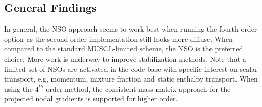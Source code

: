 \subsection{General Findings}
In general, the NSO approach seems to work best when running the fourth-order option as the second-order 
implementation still looks more diffuse. When compared to the standard MUSCL-limited scheme, the NSO
is the preferred choice. More work is underway to improve stabilization methods.
Note that a limited set of NSOs are activated in the code base with specific
interest on scalar transport, e.g, momentum, mixture fraction and static enthalpy transport. 
When using the $4^{th}$  order method, the consistent mass matrix approach for the projected 
nodal gradients is supported for higher order.
